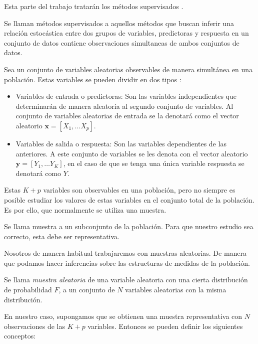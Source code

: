 \noindent Esta parte del trabajo tratarán los métodos supervisados \cite{Mahesh 2020}. 
\begin{defi}
Se llaman métodos supervisados  a aquellos métodos que buscan inferir una relación estocástica entre dos grupos de variables, predictoras y respuesta en un conjunto de datos contiene observaciones simultaneas de ambos conjuntos de datos. 
\end{defi}
\noindent Sea un conjunto de variables aleatorias observables de manera simultánea en una población. Estas variables se pueden dividir en dos tipos \cite{Hastie 2001}:
\begin{itemize}
\item Variables de entrada o predictoras: Son las variables independientes que determinarán de manera aleatoria al segundo conjunto de variables. Al conjunto de variables aleatorias de entrada se la denotará como el vector aleatorio $\textbf{x}=[X_1,\ldots X_p]$.

\item Variables de salida o respuesta: Son las variables dependientes de las anteriores. A este conjunto de variables se les denota con el vector aleatorio $\textbf{y}=[Y_1,\ldots Y_K]$, en el caso de que se tenga una única variable respuesta se denotará como $Y$. 
\end{itemize}

\noindent Estas $K+p$ variables son observables en una población, pero no siempre es posible estudiar los valores de estas variables en el conjunto total de la población. Es por ello, que normalmente se utiliza una muestra. 

\begin{defi}
Se llama muestra a un subconjunto de la población. Para que nuestro estudio sea correcto, esta debe ser representativa.
\end{defi}

\noindent Nosotros de manera habitual trabajaremos con muestras aleatorias. De manera que podamos hacer inferencias sobre las estructuras de medidas de la población. 

\begin{defi}
Se llama \emph{muestra aleatoria} de una variable aleatoria con una cierta distribución de probabilidad $F$, a un conjunto de $N$ variables aleatorias con la misma distribución. 
\end{defi} 

\noindent En nuestro caso, supongamos que se obtienen una muestra representativa con $N$ observaciones de las $K+p$ variables. Entonces se pueden definir los siguientes conceptos:

